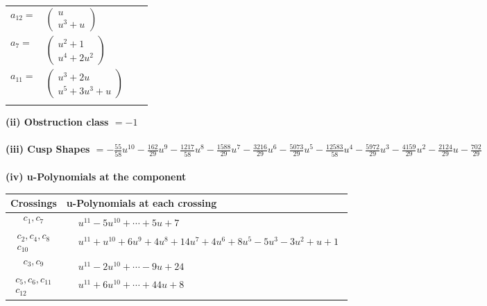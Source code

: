 \documentclass[1p]{elsarticle_modified}
\theoremstyle{definition}
\begin{document}
\begin{tabular}{m{7pt} m{180pt} m{7pt} m{180pt} }
\flushright $a_{12}=$&$\begin{pmatrix}u\\u^3+u\end{pmatrix}$ \\
\flushright $a_{7}=$&$\begin{pmatrix}u^2+1\\u^4+2 u^2\end{pmatrix}$ \\
\flushright $a_{11}=$&$\begin{pmatrix}u^3+2 u\\u^5+3 u^3+u\end{pmatrix}$\\&\end{tabular}
\flushleft \textbf{(ii) Obstruction class $= -1$}\\~\\
\flushleft \textbf{(iii) Cusp Shapes $= -\frac{55}{58} u^{10}-\frac{162}{29} u^9-\frac{1217}{58} u^8-\frac{1588}{29} u^7-\frac{3216}{29} u^6-\frac{5073}{29} u^5-\frac{12583}{58} u^4-\frac{5972}{29} u^3-\frac{4159}{29} u^2-\frac{2124}{29} u-\frac{702}{29}$}\\~\\
\newpage\renewcommand{\arraystretch}{1}
\flushleft \textbf{(iv) u-Polynomials at the component}\newline \\
\begin{tabular}{m{50pt}|m{274pt}}
Crossings & \hspace{64pt}u-Polynomials at each crossing \\
\hline $$\begin{aligned}c_{1},c_{7}\end{aligned}$$&$\begin{aligned}
&u^{11}-5 u^{10}+\cdots+5 u+7
\end{aligned}$\\
\hline $$\begin{aligned}c_{2},c_{4},c_{8}\\c_{10}\end{aligned}$$&$\begin{aligned}
&u^{11}+u^{10}+6 u^9+4 u^8+14 u^7+4 u^6+8 u^5-5 u^3-3 u^2+u+1
\end{aligned}$\\
\hline $$\begin{aligned}c_{3},c_{9}\end{aligned}$$&$\begin{aligned}
&u^{11}-2 u^{10}+\cdots-9 u+24
\end{aligned}$\\
\hline $$\begin{aligned}c_{5},c_{6},c_{11}\\c_{12}\end{aligned}$$&$\begin{aligned}
&u^{11}+6 u^{10}+\cdots+44 u+8
\end{aligned}$\\
\hline
\end{tabular}\\~\\
\end{document}
